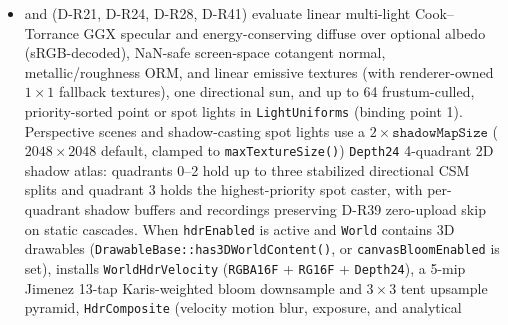 \begin{itemize}
        the latest earlier batch with that key when nothing drawn in between
        overlaps it (D-R34), so a list of widgets (background, icon, label
        each) draws as a few batches while every pixel keeps its painter-order
        sequence of writes; there is no global texture sort. Shapes without
        a custom style draw as sprites of the renderer's white texel, so
        shapes, sprites and text share one pipeline (D-R35); a visual of more
        than 64 items that are all shapes, and guest recordings, keep the
        shape mesh.
        Pixel-space rebuilds conservatively reject quads outside the logical
        viewport. An optional top-left logical-pixel clip rejects fully
        excluded quads before upload and uses nested, intersected scissor
        tokens for partial content; popping the clip restores any outer
        scissor (D-R23). World-space behavior is unchanged.
        Dynamic buffers reserve 1,024 quads, double as needed, and stop at a
        configurable 65,536 default ceiling.
  \item {} and  (D-R21, D-R24,
        D-R28, D-R41) evaluate linear multi-light Cook--Torrance GGX specular
        and energy-conserving diffuse over optional albedo (sRGB-decoded),
        NaN-safe screen-space cotangent normal, metallic/roughness ORM, and
        linear emissive textures (with renderer-owned $1\times 1$ fallback
        textures), one directional sun, and up to 64 frustum-culled,
        priority-sorted point or spot lights in \texttt{LightUniforms}
        (binding point 1). Perspective scenes and shadow-casting spot lights
        use a $2 \times \texttt{shadowMapSize}$ ($2048\times 2048$ default,
        clamped to \texttt{maxTextureSize()}) \texttt{Depth24} 4-quadrant 2D
        shadow atlas: quadrants 0--2 hold up to three stabilized directional
        CSM splits and quadrant 3 holds the highest-priority spot caster, with
        per-quadrant  shadow buffers and recordings
        preserving D-R39 zero-upload skip on static cascades. When
        \texttt{hdrEnabled} is active and \texttt{World} contains 3D drawables
        (\texttt{DrawableBase::has3DWorldContent()}, or
        \texttt{canvasBloomEnabled} is set),
         installs
        \texttt{WorldHdrVelocity} (\texttt{RGBA16F} + \texttt{RG16F} +
        \texttt{Depth24}), a 5-mip Jimenez 13-tap Karis-weighted bloom
        downsample and $3\times 3$ tent upsample pyramid,
        \texttt{HdrComposite} (velocity motion blur, exposure, and analytical

\end{itemize}

